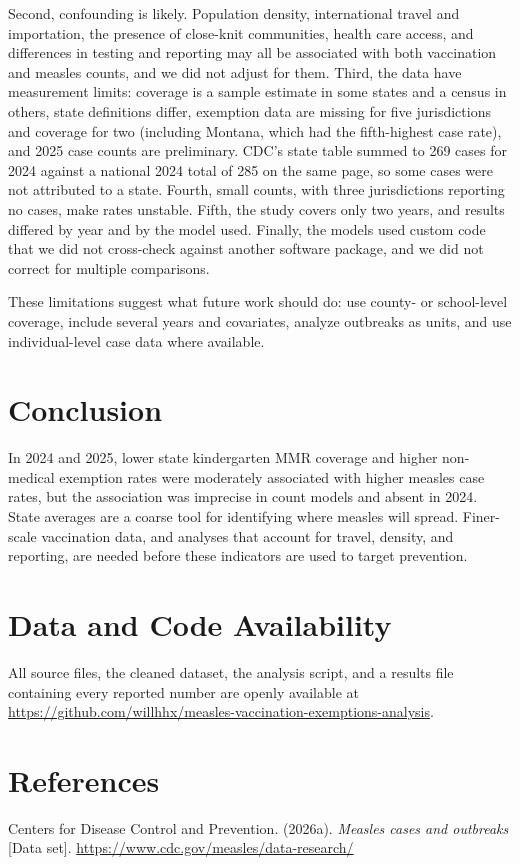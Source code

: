 \documentclass[12pt]{article}
\begin{document}
Second, confounding is likely. Population density, international travel and importation, the presence of close-knit communities, health care access, and differences in testing and reporting may all be associated with both vaccination and measles counts, and we did not adjust for them. Third, the data have measurement limits: coverage is a sample estimate in some states and a census in others, state definitions differ, exemption data are missing for five jurisdictions and coverage for two (including Montana, which had the fifth-highest case rate), and 2025 case counts are preliminary. CDC's state table summed to 269 cases for 2024 against a national 2024 total of 285 on the same page, so some cases were not attributed to a state. Fourth, small counts, with three jurisdictions reporting no cases, make rates unstable. Fifth, the study covers only two years, and results differed by year and by the model used. Finally, the models used custom code that we did not cross-check against another software package, and we did not correct for multiple comparisons.

These limitations suggest what future work should do: use county- or school-level coverage, include several years and covariates, analyze outbreaks as units, and use individual-level case data where available.

\section*{Conclusion}
In 2024 and 2025, lower state kindergarten MMR coverage and higher non-medical exemption rates were moderately associated with higher measles case rates, but the association was imprecise in count models and absent in 2024. State averages are a coarse tool for identifying where measles will spread. Finer-scale vaccination data, and analyses that account for travel, density, and reporting, are needed before these indicators are used to target prevention.

\section*{Data and Code Availability}
All source files, the cleaned dataset, the analysis script, and a results file containing every reported number are openly available at \url{https://github.com/willhhx/measles-vaccination-exemptions-analysis}.

\section*{References}
\begingroup\small\setlength{\parindent}{-0.5in}\setlength{\leftskip}{0.5in}\setlength{\parskip}{4pt}
Centers for Disease Control and Prevention. (2026a). \emph{Measles cases and outbreaks} [Data set]. \url{https://www.cdc.gov/measles/data-research/}
\end{document}
